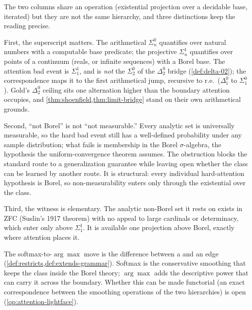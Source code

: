 \begin{remark}
\label{rmk:attention-descriptive}
The two columns share an operation (existential projection over a decidable base, iterated) but they are not the same hierarchy, and three distinctions keep the reading precise.

First, the superscript matters. The arithmetical $\Sigma^0_n$ quantifies over natural numbers with a computable base predicate; the projective $\Sigma^1_n$ quantifies over points of a continuum (reals, or infinite sequences) with a Borel base. The attention bad event is $\Sigma^1_1$, and is \emph{not} the $\Sigma^0_2$ of the $\Delta^0_2$ bridge (\cref{def:delta-02}); the correspondence maps it to the first arithmetical jump, recursive to r.e.\ ($\Delta^0_1$ to $\Sigma^0_1$). Gold's $\Delta^0_2$ ceiling sits one alternation higher than the boundary attention occupies, and \cref{thm:shoenfield,thm:limit-bridge} stand on their own arithmetical grounds.

Second, ``not Borel'' is not ``not measurable.'' Every analytic set is universally measurable, so the hard bad event still has a well-defined probability under any sample distribution; what fails is membership in the Borel $\sigma$-algebra, the hypothesis the uniform-convergence theorem assumes. The obstruction blocks the standard route to a generalization guarantee while leaving open whether the class can be learned by another route. It is structural: every individual hard-attention hypothesis is Borel, so non-measurability enters only through the existential over the class.

Third, the witness is elementary. The analytic non-Borel set it rests on exists in ZFC (Suslin's 1917 theorem) with no appeal to large cardinals or determinacy, which enter only above $\Sigma^1_1$. It is available one projection above Borel, exactly where attention places it.

The softmax-to-$\arg\max$ move is the difference between a  and an  edge (\cref{def:restricts,def:extends-grammar}). Softmax is the conservative smoothing that keeps the class inside the Borel theory; $\arg\max$ adds the descriptive power that can carry it across the boundary. Whether this can be made functorial (an exact correspondence between the smoothing operations of the two hierarchies) is open (\cref{op:attention-lightface}).
\end{remark}

